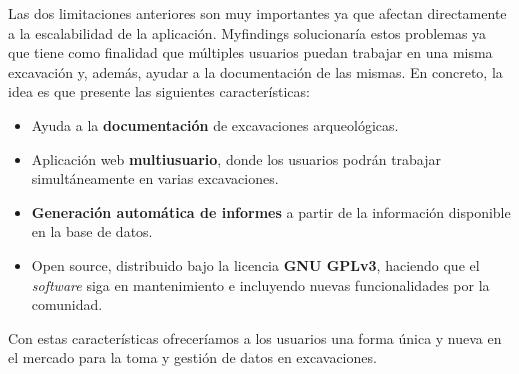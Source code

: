 Las dos limitaciones anteriores son muy importantes ya que afectan directamente a la
escalabilidad de la aplicación. Myfindings solucionaría estos problemas ya que tiene como
finalidad que múltiples usuarios puedan trabajar en una misma excavación y, además, ayudar a
la documentación de las mismas. En concreto, la idea es que presente las siguientes
características:

    \begin{itemize}
        \item Ayuda a la \textbf{documentación} de excavaciones arqueológicas.
        \item Aplicación web \textbf{multiusuario}, donde los usuarios podrán trabajar
        simultáneamente en varias excavaciones.
        \item \textbf{Generación automática de informes} a partir de la información 
        disponible en la base de datos.
        \item Open source, distribuido bajo la licencia \textbf{GNU GPLv3}, haciendo que
        el \textit{software} siga en mantenimiento e incluyendo nuevas funcionalidades por
        la comunidad.
    \end{itemize}

Con estas características ofreceríamos a los usuarios una forma única y nueva en el
mercado para la toma y gestión de datos en excavaciones.
